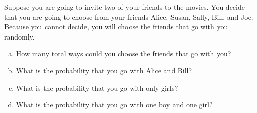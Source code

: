 \documentclass[11pt,letterpaper]{article}
\begin{document}
\newpage



 Suppose you are going to invite two of your friends to the movies. You decide that you are going to choose from your friends Alice, Susan, Sally, Bill, and Joe. Because you cannot decide, you will choose the friends that go with you randomly. 
	\begin{enumerate}[(a)]
	\item How many total ways could you choose the friends that go with you?
	\item What is the probability that you go with Alice and Bill?
	\item What is the probability that you go with only girls?
	\item What is the probability that you go with one boy and one girl?
	\end{enumerate} \pspace
\end{document}
